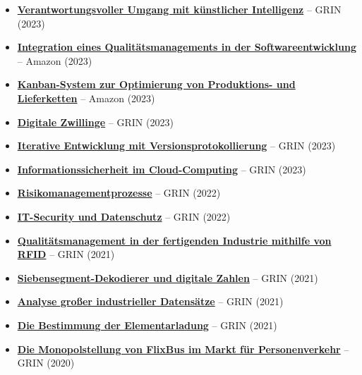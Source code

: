 \documentclass[a4paper,10pt]{article}
\begin{document}
\begin{itemize}
    \item \textbf{\href{https://www.grin.com/document/1382179}{Verantwortungsvoller Umgang mit künstlicher Intelligenz}} – GRIN (2023)  
    \item \textbf{\href{https://amzn.eu/d/00F2U5M}{Integration eines Qualitätsmanagements in der Softwareentwicklung}} – Amazon (2023)  
    \item \textbf{\href{https://amzn.eu/d/7YCaeFZ}{Kanban-System zur Optimierung von Produktions- und Lieferketten}} – Amazon (2023)  
    \item \textbf{\href{https://www.grin.com/document/1361892}{Digitale Zwillinge}} – GRIN (2023)  
    \item \textbf{\href{https://www.grin.com/document/1361892}{Iterative Entwicklung mit Versionsprotokollierung}} – GRIN (2023)  
    \item \textbf{\href{https://www.grin.com/document/1318357}{Informationssicherheit im Cloud-Computing}} – GRIN (2023)  
    \item \textbf{\href{https://www.grin.com/document/1293242}{Risikomanagementprozesse}} – GRIN (2022)  
    \item \textbf{\href{https://www.grin.com/document/1264668}{IT-Security und Datenschutz}} – GRIN (2022)  
    \item \textbf{\href{https://www.grin.com/document/1264682}{Qualitätsmanagement in der fertigenden Industrie mithilfe von RFID}} – GRIN (2021)  
    \item \textbf{\href{https://www.grin.com/document/1264678}{Siebensegment-Dekodierer und digitale Zahlen}} – GRIN (2021)  
    \item \textbf{\href{https://www.grin.com/document/1264676}{Analyse großer industrieller Datensätze}} – GRIN (2021)  
    \item \textbf{\href{https://www.grin.com/document/1336653}{Die Bestimmung der Elementarladung}} – GRIN (2021)  
    \item \textbf{\href{https://www.grin.com/document/1336653}{Die Monopolstellung von FlixBus im Markt für Personenverkehr}} – GRIN (2020)  
\end{itemize}
\end{document}
